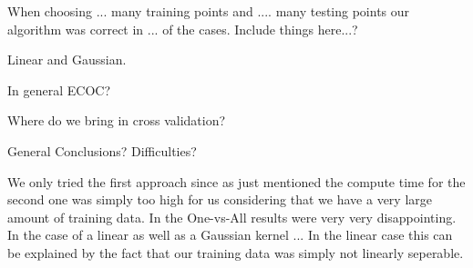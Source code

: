 When choosing ... many training points and .... many testing points our algorithm was correct in ... of the cases. Include things here...?


Linear and Gaussian.

In general ECOC?

Where do we bring in cross validation?

General Conclusions? Difficulties?

We only tried the first approach since as just mentioned the compute time for the second one was simply too high for us considering that we have a very large amount of training data. In the One-vs-All results were very very disappointing. In the case of a linear as well as a Gaussian kernel ... In the linear case this can be explained by the fact that our training data was simply not linearly seperable. 